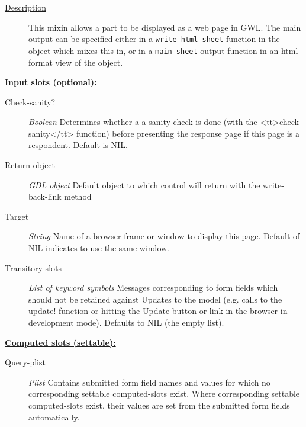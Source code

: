 \documentclass [11pt]{book}
\begin{document}
\begin{itemize}
\begin{description}

\item [
\underline{Description}]


This mixin allows a part to be displayed as a web page in GWL. 
The main output can be specified either in a \texttt{write-html-sheet} function in the object which
mixes  this in, or in a \texttt{main-sheet} output-function in an html-format view of the 
object.



\end{description}








\textbf{
\underline{Input slots (optional):}}

\begin{description}

\item [Check-sanity?]
\emph{Boolean} Determines whether a a sanity check is done (with the <tt>check-sanity</tt> function) before
presenting the response page if this page is a respondent. Default is NIL.


\item [Return-object]
\emph{GDL object} Default object to which control will return with the write-back-link method


\item [Target]
\emph{String} Name of a browser frame or window to display this page. Default of NIL indicates to use the same window.


\item [Transitory-slots]
\emph{List of keyword symbols} Messages corresponding to form fields which should not be retained
against Updates to the model (e.g. calls to the update! function or hitting the Update button or link in
the browser in development mode). Defaults to NIL (the empty list).


\end{description}






\textbf{
\underline{Computed slots (settable):}}

\begin{description}

\item [Query-plist]
\emph{Plist} Contains submitted form field names and values for which no corresponding settable
computed-slots exist. Where corresponding settable computed-slots exist, their values are set from
the submitted form fields automatically.



\end{description}
\end{itemize}
\end{document}
